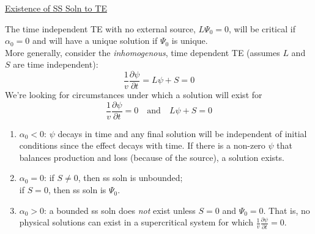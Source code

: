\documentclass[12pt]{article}
\begin{document}
\vspace*{1 em}
\underline{Existence of SS Soln to TE}

The time independent TE with no external source, $L\Psi_0 = 0$, will be critical if $\alpha_0 = 0$ and will have a unique solution if $\Psi_0$ is unique. \\
More generally, consider the \textit{inhomogenous}, time dependent TE (assumes $L$ and $S$ are time independent):
%
\[\frac{1}{v}\frac{\partial \psi}{\partial t} = L\psi + S = 0\]
%
We're looking for circumstances under which a solution will exist for
\[\frac{1}{v}\frac{\partial \psi}{\partial t} = 0 \quad \text{and} \quad L\psi + S = 0\]

\begin{enumerate}
\item $\alpha_0 < 0$: $\psi$ decays in time and any final solution will be independent of initial conditions since the effect decays with time. If there is a non-zero $\psi$ that balances production and loss (because of the source), a solution exists.
\item $\alpha_0 = 0$: if $S \neq 0$, then ss soln is unbounded; \\
\hspace*{3.5 em}if $S=0$, then ss soln is $\Psi_0$.
\item $\alpha_0 > 0$: a bounded ss soln does \textit{not} exist unless $S=0$ and $\Psi_0 = 0$. That is, no physical solutions can exist in a supercritical system for which $\frac{1}{v}\frac{\partial \psi}{\partial t} = 0$.
\end{enumerate}
\end{document}
